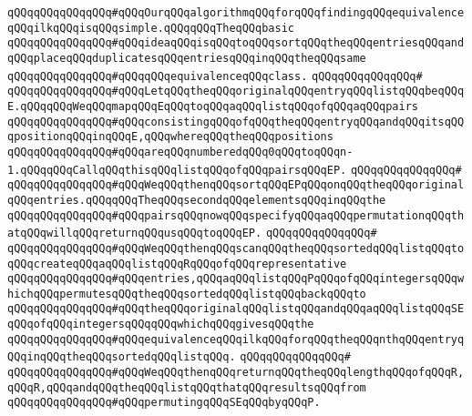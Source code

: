 \newline
\verb|qQQqqQQqqQQqqQQq#qQQqOurqQQqalgorithmqQQqforqQQqfindingqQQqequivalenceqQQqilkqQQqisqQQqsimple.qQQqqQQqTheqQQqbasic|\newline
\verb|qQQqqQQqqQQqqQQq#qQQqideaqQQqisqQQqtoqQQqsortqQQqtheqQQqentriesqQQqandqQQqplaceqQQqduplicatesqQQqentriesqQQqinqQQqtheqQQqsame|\newline
\verb|qQQqqQQqqQQqqQQq#qQQqqQQqequivalenceqQQqclass.|\newline
\verb|qQQqqQQqqQQqqQQq#|\newline
\verb|qQQqqQQqqQQqqQQq#qQQqLetqQQqtheqQQqoriginalqQQqentryqQQqlistqQQqbeqQQqE.qQQqqQQqWeqQQqmapqQQqEqQQqtoqQQqaqQQqlistqQQqofqQQqaqQQqpairs|\newline
\verb|qQQqqQQqqQQqqQQq#qQQqconsistingqQQqofqQQqtheqQQqentryqQQqandqQQqitsqQQqpositionqQQqinqQQqE,qQQqwhereqQQqtheqQQqpositions|\newline
\verb|qQQqqQQqqQQqqQQq#qQQqareqQQqnumberedqQQq0qQQqtoqQQqn-1.qQQqqQQqCallqQQqthisqQQqlistqQQqofqQQqpairsqQQqEP.|\newline
\verb|qQQqqQQqqQQqqQQq#|\newline
\verb|qQQqqQQqqQQqqQQq#qQQqWeqQQqthenqQQqsortqQQqEPqQQqonqQQqtheqQQqoriginalqQQqentries.qQQqqQQqTheqQQqsecondqQQqelementsqQQqinqQQqthe|\newline
\verb|qQQqqQQqqQQqqQQq#qQQqpairsqQQqnowqQQqspecifyqQQqaqQQqpermutationqQQqthatqQQqwillqQQqreturnqQQqusqQQqtoqQQqEP.|\newline
\verb|qQQqqQQqqQQqqQQq#|\newline
\verb|qQQqqQQqqQQqqQQq#qQQqWeqQQqthenqQQqscanqQQqtheqQQqsortedqQQqlistqQQqtoqQQqcreateqQQqaqQQqlistqQQqRqQQqofqQQqrepresentative|\newline
\verb|qQQqqQQqqQQqqQQq#qQQqentries,qQQqaqQQqlistqQQqPqQQqofqQQqintegersqQQqwhichqQQqpermutesqQQqtheqQQqsortedqQQqlistqQQqbackqQQqto|\newline
\verb|qQQqqQQqqQQqqQQq#qQQqtheqQQqoriginalqQQqlistqQQqandqQQqaqQQqlistqQQqSEqQQqofqQQqintegersqQQqqQQqwhichqQQqgivesqQQqthe|\newline
\verb|qQQqqQQqqQQqqQQq#qQQqequivalenceqQQqilkqQQqforqQQqtheqQQqnthqQQqentryqQQqinqQQqtheqQQqsortedqQQqlistqQQq.|\newline
\verb|qQQqqQQqqQQqqQQq#|\newline
\verb|qQQqqQQqqQQqqQQq#qQQqWeqQQqthenqQQqreturnqQQqtheqQQqlengthqQQqofqQQqR,qQQqR,qQQqandqQQqtheqQQqlistqQQqthatqQQqresultsqQQqfrom|\newline
\verb|qQQqqQQqqQQqqQQq#qQQqpermutingqQQqSEqQQqbyqQQqP.|\newline
